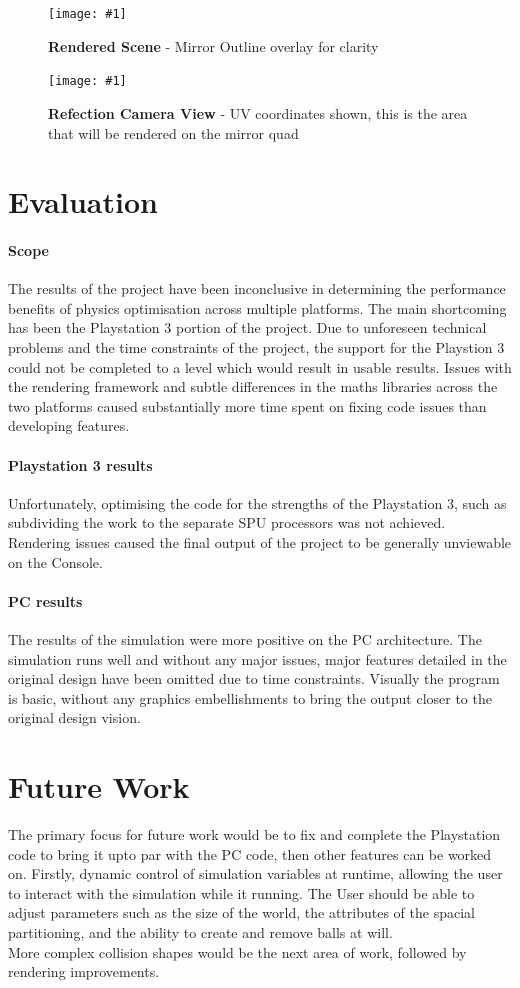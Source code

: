 \documentclass[conference]{acmsiggraph}
\newcommand{\figuremacroW}[4]{
	\begin{figure}[h] %
		\centering
		\texttt{[image: \#1]}
		\caption[#2]{\textbf{#2} - #3}
		\label{fig:#1}
	\end{figure}
}
\begin{document}
\figuremacroW
{front-Buffer}
{Rendered Scene}
{Mirror Outline overlay for clarity}
{1.0}


\figuremacroW
{ref-Buffer}
{Refection Camera View}
{UV coordinates shown, this is the area that will be rendered on the mirror quad}
{1.0}

\section{Evaluation}

\paragraph{Scope}
The results of the project have been inconclusive in determining the performance benefits of physics optimisation across multiple platforms. The main shortcoming has been the Playstation 3 portion of the project. Due to unforeseen technical problems and the time constraints of the project, the support for the Playstion 3 could not be completed to a level which would result in usable results. Issues with the rendering framework and subtle differences in the maths libraries across the two platforms caused substantially more time spent on fixing code issues than developing features.

\paragraph{Playstation 3 results}
Unfortunately, optimising the code for the strengths of the Playstation 3, such as subdividing the work to the separate SPU processors was not achieved. Rendering issues caused the final output of the project to be generally unviewable on the Console.

\paragraph{PC results}
The results of the simulation were more positive on the PC architecture. The simulation runs well and without any major issues, major features detailed in the original design have been omitted due to time constraints. Visually the program is basic, without any graphics embellishments to bring the output closer to the original design vision.

\section{Future Work}
The primary focus for future work would be to fix and complete the Playstation code to bring it upto par with the PC code, then other features can be worked on. Firstly, dynamic control of simulation variables at runtime, allowing the user to interact with the simulation while it running. The User should be able to adjust parameters such as the  size of the world, the attributes of the spacial partitioning, and the ability to create and remove balls at will.\\
More complex collision shapes would be the next area of work, followed by rendering improvements.



\end{document}
